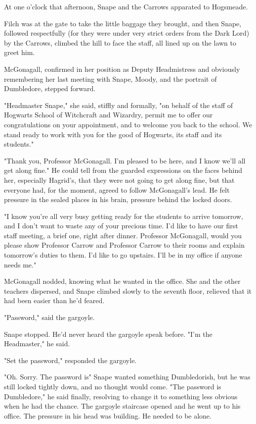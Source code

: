 At one o'clock that afternoon, Snape and the Carrows apparated to Hogsmeade.

Filch was at the gate to take the little baggage they brought, and then Snape, followed respectfully (for they were under very strict orders from the Dark Lord) by the Carrows, climbed the hill to face the staff, all lined up on the lawn to greet him.

McGonagall, confirmed in her position as Deputy Headmistress and obviously remembering her last meeting with Snape, Moody, and the portrait of Dumbledore, stepped forward.

"Headmaster Snape," she said, stiffly and formally, "on behalf of the staff of Hogwarts School of Witchcraft and Wizardry, permit me to offer our congratulations on your appointment, and to welcome you back to the school. We stand ready to work with you for the good of Hogwarts, its staff and its students."

"Thank you, Professor McGonagall. I'm pleased to be here, and I know we'll all get along fine." He could tell from the guarded expressions on the faces behind her, especially Hagrid's, that they were not going to get along fine, but that everyone had, for the moment, agreed to follow McGonagall's lead. He felt pressure in the sealed places in his brain, pressure behind the locked doors.

"I know you're all very busy getting ready for the students to arrive tomorrow, and I don't want to waste any of your precious time. I'd like to have our first staff meeting, a brief one, right after dinner. Professor McGonagall, would you please show Professor Carrow and Professor Carrow to their rooms and explain tomorrow's duties to them. I'd like to go upstairs. I'll be in my office if anyone needs me."

McGonagall nodded, knowing what he wanted in the office. She and the other teachers dispersed, and Snape climbed slowly to the seventh floor, relieved that it had been easier than he'd feared.

"Password," said the gargoyle.

Snape stopped. He'd never heard the gargoyle speak before. "I'm the Headmaster," he said.

"Set the password," responded the gargoyle.

"Oh. Sorry. The password is{\el}" Snape wanted something Dumbledorish, but he was still locked tightly down, and no thought would come. "The password is Dumbledore," he said finally, resolving to change it to something less obvious when he had the chance. The gargoyle staircase opened and he went up to his office. The pressure in his head was building. He needed to be alone.

